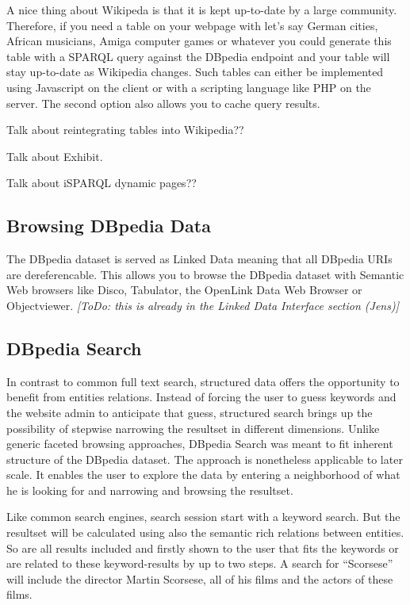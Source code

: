 \documentclass{llncs}
\newcommand{\todo}[1]{\emph{[ToDo: #1]}}
\begin{document}
A nice thing about Wikipeda is that it is kept up-to-date by a large community. Therefore, if you need a table on your webpage with let's say German cities, African musicians, Amiga computer games 
or whatever you could generate this table with a SPARQL query against the DBpedia endpoint and your table will stay up-to-date as Wikipedia changes. Such tables can either be implemented using Javascript on the client or with a scripting language like PHP on the server. The second option also allows you to cache query results. 

Talk about reintegrating tables into Wikipedia??

Talk about Exhibit.

Talk about iSPARQL dynamic pages??

\subsection{Browsing DBpedia Data}

The DBpedia dataset is served as Linked Data meaning that all DBpedia URIs are dereferencable. This allows you to browse the DBpedia dataset with Semantic Web browsers like Disco, Tabulator, the OpenLink Data Web Browser or Objectviewer.
\todo{this is already in the Linked Data Interface section (Jens)}


\subsection{DBpedia Search}
In contrast to common full text search, structured data offers the opportunity to benefit from entities relations. 
Instead of forcing the user to guess keywords and the website admin to anticipate that guess, structured search brings up the possibility of stepwise narrowing the resultset in different dimensions. Unlike generic faceted browsing approaches, DBpedia Search was meant to fit inherent structure of the DBpedia dataset. The approach is nonetheless applicable to later scale. It enables the user to explore the data by entering a neighborhood of what he is looking for and narrowing and browsing the resultset.

Like common search engines, search session start with a keyword search. But the resultset will be calculated using also the semantic rich relations between entities. So are all results included and firstly shown to the user that fits the keywords or are related to these keyword-results by up to two steps.
A search for "`Scorsese"' will include the director Martin Scorsese, all of his films and the actors of these films.
\end{document}
